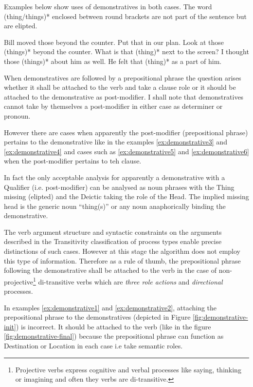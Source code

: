 Examples below show uses of demonstratives in both cases. The word (thing/things)* enclosed between round brackets are not part of the sentence but are elipted.  

\begin{exe}
\ex\label{ex:demonstrative1} Bill moved those beyond the counter.
\ex\label{ex:demonstrative2} Put that in our plan.
\ex\label{ex:demonstrative3} Look at those (things)* beyond the counter.
\ex\label{ex:demonstrative4} What is that (thing)* next to the screen?
\ex\label{ex:demonstrative5} I thought those (things)* about him as well.
\ex\label{ex:demonstrative6} He felt that (thing)* as a part of him. 
\end{exe}
When demonstratives are followed by a prepositional phrase the question arises whether it shall be attached to the verb and take a clause role or it should be attached to the demonstrative as post-modifier. I shall note that demonstratives cannot take by themselves a post-modifier in either case as determiner or pronoun. 

However there are cases when apparently the post-modifier (prepositional phrase) pertains to the demonstrative like in the examples \ref{ex:demonstrative3} and \ref{ex:demonstrative4} and cases such as \ref{ex:demonstrative5} and \ref{ex:demonstrative6} when the post-modifier pertains to teh clause. 

In fact the only acceptable analysis for apparently a demonstrative with a Qualifier (i.e. post-modifier) can be analysed as noun phrases with the Thing missing (elipted) and the Deictic taking the role of the Head. The implied missing head is the generic noun ``thing(s)'' or any noun anaphorically binding the demonstrative.

The verb argument structure and syntactic constraints on the arguments described in the Transitivity classification of process types enable precise distinctions of such cases. However at this stage the algorithm does not employ this type of information. Therefore as a rule of thumb, the prepositional phrase following the demonstrative shall be attached to the verb in the case of non-projective\footnote{Projective verbs express cognitive and verbal processes like saying, thinking or imagining and often they verbs are di-transitive.} di-transitive verbs which are \textit{three role actions} and \textit{directional} processes.

In examples \ref{ex:demonstrative1} and \ref{ex:demonstrative2}, attaching the prepositional phrase to the demonstratives (depicted in Figure \ref{fig:demonstrative-init}) is incorrect. It should be attached to the verb (like in the figure \ref{fig:demonstrative-final}) because the prepositional phrase can function as Destination or Location in each case i.e take semantic roles. 

